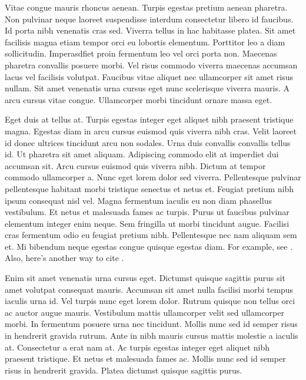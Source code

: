 Vitae congue mauris rhoncus aenean. Turpis egestas pretium aenean pharetra.
Non pulvinar neque laoreet suspendisse interdum consectetur libero id
faucibus. Id porta nibh venenatis cras sed. Viverra tellus in hac habitasse
platea. Sit amet facilisis magna etiam tempor orci eu lobortis elementum.
Porttitor leo a diam sollicitudin. Imperasdfiet proin fermentum leo vel orci
porta non. Maecenas pharetra convallis posuere morbi. Vel risus commodo
viverra maecenas accumsan lacus vel facilisis volutpat. Faucibus vitae
aliquet nec ullamcorper sit amet risus nullam. Sit amet venenatis urna cursus
eget nunc scelerisque viverra mauris. A arcu cursus vitae congue. Ullamcorper
morbi tincidunt ornare massa eget.
%


Eget duis at tellus at. Turpis egestas integer eget aliquet nibh praesent
tristique magna. Egestas diam in arcu cursus euismod quis viverra nibh cras.
Velit laoreet id donec ultrices tincidunt arcu non sodales. Urna duis
convallis convallis tellus id. Ut pharetra sit amet aliquam. Adipiscing
commodo elit at imperdiet dui accumsan sit. Arcu cursus euismod quis viverra
nibh. Dictum at tempor commodo ullamcorper a. Nunc eget lorem dolor sed
viverra. Pellentesque pulvinar pellentesque habitant morbi tristique senectus
et netus et. Feugiat pretium nibh ipsum consequat nisl vel. Magna fermentum
iaculis eu non diam phasellus vestibulum. Et netus et malesuada fames ac
turpis. Purus ut faucibus pulvinar elementum integer enim neque. Sem
fringilla ut morbi tincidunt augue. Facilisi cras fermentum odio eu feugiat
pretium nibh. Pellentesque nec nam aliquam sem et. Mi bibendum neque egestas
congue quisque egestas diam. For example, see \citet{fama1992cross}. Also, here's another
way to cite \citep{sharpe1964capital}.


Enim sit amet venenatis urna cursus eget. Dictumst quisque sagittis purus sit
amet volutpat consequat mauris. Accumsan sit amet nulla facilisi morbi tempus
iaculis urna id. Vel turpis nunc eget lorem dolor. Rutrum quisque non tellus
orci ac auctor augue mauris. Vestibulum mattis ullamcorper velit sed
ullamcorper morbi. In fermentum posuere urna nec tincidunt. Mollis nunc sed
id semper risus in hendrerit gravida rutrum. Ante in nibh mauris cursus
mattis molestie a iaculis at. Consectetur a erat nam at. Ac turpis egestas
integer eget aliquet nibh praesent tristique. Et netus et malesuada fames ac.
Mollis nunc sed id semper risus in hendrerit gravida. Platea dictumst quisque
sagittis purus.

